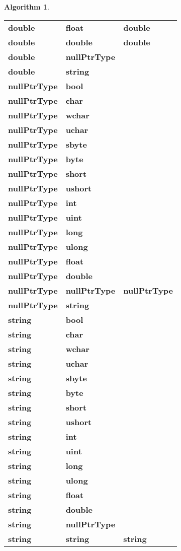 \documentclass[a4paper,oneside,11pt]{book}
\theoremstyle{definition}
\newtheorem{algo}{Algorithm}[section]
\begin{document}
\begin{algo}
\begin{flushleft}
\begin{supertabular}{lll}
\textbf{double}& \textbf{float}& \textbf{double}\\
\textbf{double}& \textbf{double}& \textbf{double}\\
\textbf{double}& \textbf{nullPtrType}& \\
\textbf{double}& \textbf{string}& \\
\hline
\textbf{nullPtrType}& \textbf{bool}&\\
\textbf{nullPtrType}& \textbf{char}& \\
\textbf{nullPtrType}& \textbf{wchar}& \\
\textbf{nullPtrType}& \textbf{uchar}& \\
\textbf{nullPtrType}& \textbf{sbyte}& \\
\textbf{nullPtrType}& \textbf{byte}& \\
\textbf{nullPtrType}& \textbf{short}& \\
\textbf{nullPtrType}& \textbf{ushort}& \\
\textbf{nullPtrType}& \textbf{int}& \\
\textbf{nullPtrType}& \textbf{uint}& \\
\textbf{nullPtrType}& \textbf{long}& \\
\textbf{nullPtrType}& \textbf{ulong}& \\
\textbf{nullPtrType}& \textbf{float}& \\
\textbf{nullPtrType}& \textbf{double}& \\
\textbf{nullPtrType}& \textbf{nullPtrType}& \textbf{nullPtrType}\\
\textbf{nullPtrType}& \textbf{string}& \\
\hline
\textbf{string}& \textbf{bool}& \\
\textbf{string}& \textbf{char}& \\
\textbf{string}& \textbf{wchar}& \\
\textbf{string}& \textbf{uchar}& \\
\textbf{string}& \textbf{sbyte}& \\
\textbf{string}& \textbf{byte}& \\
\textbf{string}& \textbf{short}& \\
\textbf{string}& \textbf{ushort}& \\
\textbf{string}& \textbf{int}& \\
\textbf{string}& \textbf{uint}& \\
\textbf{string}& \textbf{long}& \\
\textbf{string}& \textbf{ulong}& \\
\textbf{string}& \textbf{float}& \\
\textbf{string}& \textbf{double}& \\
\textbf{string}& \textbf{nullPtrType}& \\
\textbf{string}& \textbf{string}& \textbf{string}\\
\hline
\end{supertabular}
\end{flushleft}
\end{algo}
\end{document}
